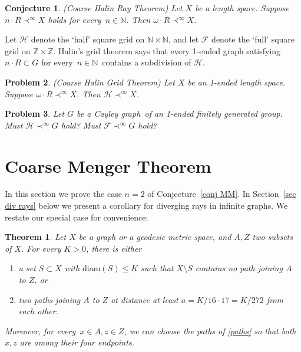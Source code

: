 \documentclass[a4paper]{article}
\newtheorem{theorem}[proposition]{Theorem}
\newtheorem{conjecture}{{Conjecture}}[section]
\newtheorem{problem}[conjecture]{{Problem}}
\newcommand{\N}{\ensuremath{\mathbb N}}
\newcommand{\Z}{\ensuremath{\mathbb Z}}
\newcommand{\nin}{\ensuremath{{n\in\N}}}
\newcommand{\Cg}{Cayley graph}
\newcommand{\Sr}[1]{Section~\ref{#1}}
\newcommand{\Cnr}[1]{Con\-jecture~\ref{#1}}
\newcommand{\fe}{for every}
\newcommand{\diam}{\mathrm{diam}}
\begin{document}
\begin{conjecture} \label{Cnr HRT}
(Coarse Halin Ray Theorem) Let $X$ be a length space. Suppose $n\cdot R \prec^\infty X$ holds \fe\ \nin. Then $\omega \cdot R \prec^\infty X$.
\end{conjecture}

Let $\mathcal{H}$ denote the `half' square grid on $\N \times \N$, and let $\mathcal{F}$  denote the `full' square grid on $\Z \times \Z$. Halin's grid theorem \cite{halin65} says that every 1-ended graph satisfying $n\cdot R \subset G$ \fe\ \nin\ contains a subdivision of $\mathcal{H}$.

\begin{problem}
(Coarse Halin Grid Theorem) Let $X$ be an 1-ended length space. Suppose $\omega \cdot R \prec^\infty X$. Then $\mathcal{H} \prec^\infty X$.
\end{problem}

\begin{problem}
Let $G$ be a \Cg\ of an 1-ended finitely generated group. Must $\mathcal{H} \prec^\infty G$ hold? Must $\mathcal{F} \prec^\infty G$ hold?
\end{problem}


\section{Coarse Menger Theorem} \label{sec Menger}

In this section we prove the case $n=2$ of \Cnr{conj MM}. In \Sr{sec div rays} below we present a corollary for diverging rays in infinite graphs. We restate our special case for convenience: 

\begin{theorem} \label{Menger}
Let $X$ be a graph or a geodesic metric space, and $A,Z$ two subsets of $X$. For every $K>0$, there is either
\begin{enumerate}
\item \label{S} a set $S \subset X$ with $\diam(S)\leq K$ such that $X \setminus S$ contains no path joining $A$ to $Z$, or 
\item \label{paths} two paths joining $A$ to $Z$ at distance at least $a=K/16\cdot 17=K/272$ from each other.
\end{enumerate}
Moreover, \fe\ $x\in A, z\in Z$, we can choose the paths of \ref{paths} so that both $x,z$ are among their four endpoints.

\end{theorem}
\end{document}
